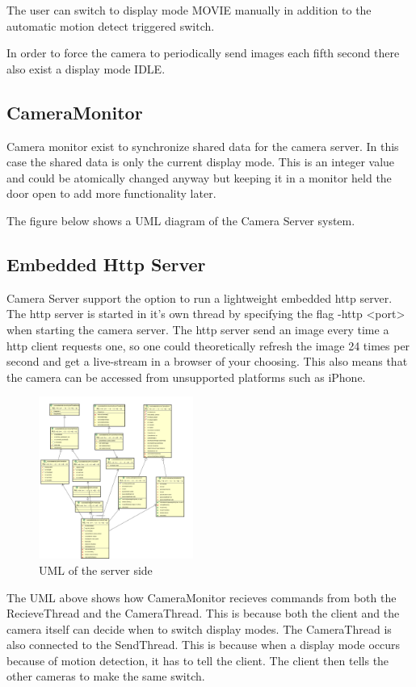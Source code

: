 \documentclass[8pt,titlepage]{article}
\begin{document}
The user can switch to display mode MOVIE manually in addition to the automatic motion detect triggered switch.

In order to force the camera to periodically send images each fifth second there also exist a display mode IDLE.

\subsection{CameraMonitor}
Camera monitor exist to synchronize shared data for the camera server. In this case the shared data is only the current display mode. This is an integer value and could be atomically changed anyway but keeping it in a monitor held the door open to add more functionality later.

The figure below shows a UML diagram of the Camera Server system. 

\subsection{Embedded Http Server}
Camera Server support the option to run a lightweight embedded http server. The http server is started in it’s own thread by specifying the flag -http <port> when starting the camera server. The http server send an image every time a http client requests one, so one could theoretically refresh the image 24 times per second and get a live-stream in a browser of your choosing. This also means that the camera can be accessed from unsupported platforms such as iPhone.

\begin{figure}[hbp]
\includegraphics[width=0.45\textwidth]{../uml/server.png}
\caption{UML of the server side}
\end{figure}

The UML above shows how CameraMonitor recieves commands from both the RecieveThread and the CameraThread. This is because both the client and the camera itself can decide when to switch display modes. The CameraThread is also connected to the SendThread. This is because when a display mode occurs because of motion detection, it has to tell the client. The client then tells the other cameras to make the same switch.
\end{document}
